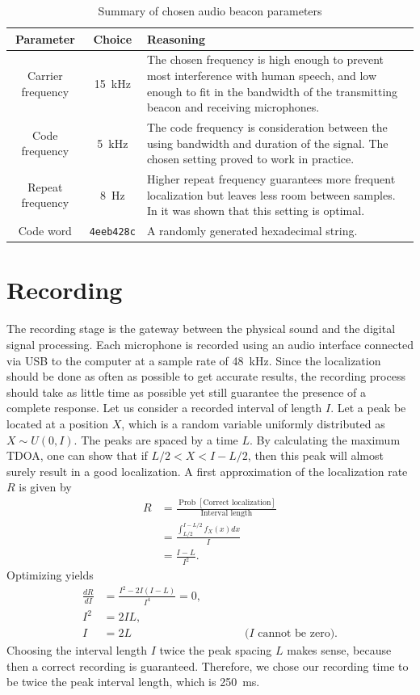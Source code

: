 \documentclass[11pt,titlepage]{report}
\begin{document}
\begin{table}[H]
\centering
\begin{tabular}{ c | c | p{10cm}}
\hline \hline
Parameter & Choice & Reasoning \\
\hline
Carrier frequency & \SI{15}{kHz} & 
The chosen frequency is high enough to prevent most interference with human speech, and low enough to fit in the bandwidth of the transmitting beacon and receiving microphones.\\
Code frequency & \SI{5}{kHz} & The code frequency is consideration between the using bandwidth and duration of the signal. The chosen setting proved to work in practice. \\
Repeat frequency & \SI{8}{Hz} & Higher repeat frequency guarantees more frequent localization but leaves less room between samples. In \cite{epo4-del7} it was shown that this setting is optimal.\\
Code word & \texttt{4eeb428c} & A randomly generated hexadecimal string.\\
\end{tabular}
\caption{Summary of chosen audio beacon parameters}
\label{tab:loc_signal}
\end{table}

\section{Recording}
\label{sec:loc_data_rec}
The recording stage is the gateway between the physical sound and the digital signal processing. Each microphone is recorded using an audio interface connected via USB to the computer at a sample rate of \SI{48}{\kilo\hertz}. Since the localization should be done as often as possible to get accurate results, the recording process should take as little time as possible yet still guarantee the presence of a complete response. Let us consider a recorded interval of length $I$. Let a peak be located at a position $X$, which is a random variable uniformly distributed as $X \sim U(0,I)$. The peaks are spaced by a time $L$. By calculating the maximum TDOA, one can show that if $L/2 < X < I-L/2$, then this peak will almost surely result in a good localization. A first approximation of the localization rate $R$ is given by
\begin{align*}
	R &= \frac{\operatorname{Prob}\left[\text{Correct localization}\right]}{\text{Interval length}} \\
	&= \frac{\int_{L/2}^{I-L/2}f_{X}(x)dx}{I} \\
	&= \frac{I-L}{I^2}.
\end{align*}
Optimizing yields
\begin{align*}
	\frac{dR}{dI} &= \frac{I^2-2I(I-L)}{I^4} = 0, \\
	I^2 &= 2IL, \\
	I &= 2L \hspace{10em} \text{($I$ cannot be zero)}.
\end{align*}
Choosing the interval length $I$ twice the peak spacing $L$ makes sense, because then a correct recording is guaranteed. Therefore, we chose our recording time to be twice the peak interval length, which is \SI{250}{ms}.
\end{document}
